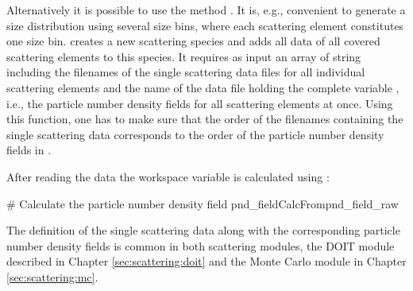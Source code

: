 Alternatively it is possible to use the method
. It is, e.g., convenient to generate a size
distribution using several size bins, where each scattering element constitutes
one size bin.  creates a new scattering
species and adds all data of all covered scattering elements to this species. It
requires as input an array of string including the filenames of the single
scattering data files for all individual scattering elements and the name of the
data file holding the complete variable , i.e., the
particle number density fields for all scattering elements at once. Using this
function, one has to make sure that the order of the filenames containing the
single scattering data corresponds to the order of the particle number density
fields in .

After reading the data the workspace variable  is
calculated using : 
\begin{code}
# Calculate the particle number density field
pnd_fieldCalcFrompnd_field_raw
\end{code}

The definition of the single scattering data along with the
corresponding particle number density fields is common in both
scattering modules, the DOIT module described in 
Chapter \ref{sec:scattering:doit} and the Monte Carlo module in
Chapter \ref{sec:scattering:mc}.


